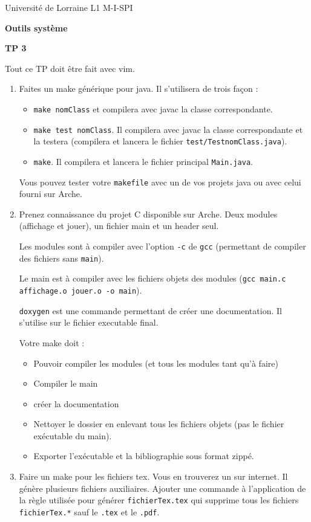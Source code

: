 \documentclass[11pt]{exam}
\begin{document}
\noindent Université de Lorraine\hfill 
L1 M-I-SPI\bigskip

\begin{center}
{\large \bf Outils système}
\smallskip

{\large \bf TP 3}
\end{center}
\doublerulefill

Tout ce TP doit être fait avec vim.

	\begin{enumerate}
		\item Faites un make générique pour java. Il s'utilisera de trois façon :
		\begin{itemize}
			\item {\tt make nomClass} et compilera avec javac la classe correspondante.
			\item {\tt make test nomClass}. Il compilera avec javac la classe correspondante et la testera (compilera et lancera le fichier {\tt test/TestnomClass.java}).
			\item {\tt make}. Il compilera et lancera le fichier principal {\tt Main.java}.
		\end{itemize}
		Vous pouvez tester votre {\tt makefile} avec un de vos projets java ou avec celui fourni sur Arche.
		
		\item Prenez connaissance du projet C disponible sur Arche. Deux modules (affichage et jouer), un fichier main et un header seul. 
		
		Les modules sont à compiler avec l'option {\tt -c} de {\tt gcc} (permettant de compiler des fichiers sans {\tt main}).
		
		Le main est à compiler avec les fichiers objets des modules ({\tt gcc main.c affichage.o jouer.o -o main}).
		
		{\tt doxygen} est une commande permettant de créer une documentation. Il s'utilise sur le fichier executable final.
		
		Votre make doit :
		\begin{itemize}
			\item Pouvoir compiler les modules (et tous les modules tant qu'à faire)
			\item Compiler le main
			\item créer la documentation
			\item Nettoyer le dossier en enlevant tous les fichiers objets (pas le fichier exécutable du main).
			\item Exporter l'exécutable et la bibliographie sous format zippé.
		\end{itemize}
		\item Faire un make pour les fichiers tex. Vous en trouverez un sur internet. Il génère plusieurs fichiers auxiliaires. Ajouter une commande à l'application de la règle utilisée pour générer {\tt fichierTex.tex} qui supprime tous les fichiers {\tt fichierTex.*} sauf le {\tt .tex} et le {\tt .pdf}.
	\end{enumerate}
	
\end{document}

